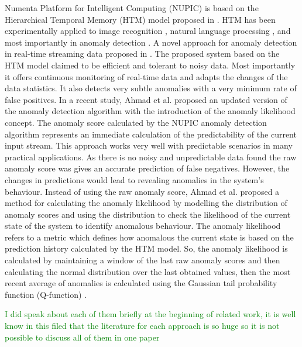 \documentclass[sigconf]{acmart}
\begin{document}
 Numenta Platform for Intelligent Computing (NUPIC) is based on the Hierarchical Temporal Memory (HTM) model proposed in \cite{Hawkins:2007fi}. HTM has been experimentally applied to image recognition \cite{vskoviera2013image}, natural language processing \cite{arel2010deep}, and most importantly in anomaly detection \cite{ziabaryhlmt,DBLP:journals/corr/LavinA15,DBLP:journals/corr/AhmadP16}.
A novel approach for anomaly detection  in real-time streaming data proposed in \cite{DBLP:journals/corr/AhmadP16,DBLP:journals/corr/LavinA15}. The proposed system based on the HTM model claimed to be efficient and tolerant to noisy data. Most importantly it offers continuous monitoring of real-time data and adapts the changes of the data statistics. It also detects very subtle anomalies with a very minimum rate of false positives. In a recent study, Ahmad et al. \cite{AHMAD2017134} proposed an updated version of the anomaly detection algorithm with the introduction of the anomaly likelihood concept. 
The anomaly score calculated by the NUPIC anomaly detection algorithm represents an immediate calculation of the predictability of the current input stream. This approach works very well with predictable scenarios in many practical applications. As there is no noisy and unpredictable data found the raw anomaly score was gives an accurate prediction of false negatives. However, the changes in predictions would lead to revealing anomalies in the system’s behaviour. Instead of using the raw anomaly score, Ahmad et al. \cite{AHMAD2017134} proposed a method for calculating the anomaly likelihood by modelling the distribution of anomaly scores and using the distribution to check the likelihood of the current state of the system to identify anomalous behaviour. The anomaly likelihood refers to a metric which defines how anomalous the current state is based on the prediction history calculated by the HTM model. So, the anomaly likelihood is calculated by maintaining a window of the last raw anomaly scores and then calculating the normal distribution over the last obtained values, then the most recent average of anomalies is calculated using the Gaussian tail probability function (Q-function) \cite{craig1991new}.
 
\textcolor{green}{I did speak about each of them briefly at the beginning of related work, it is well know in this filed that the literature for each approach is so huge so it is not possible to discuss all of them in one paper}
\end{document}
